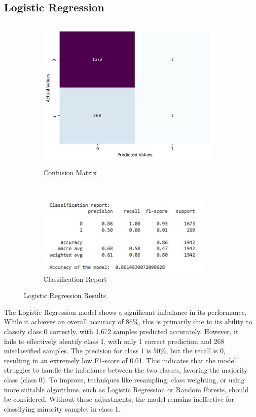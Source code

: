 \documentclass[12pt]{report}
\begin{document}
    \subsection{Logistic Regression}

    \begin{figure}[h!]
        \centering
        \begin{subfigure}[b]{0.5\textwidth}
            \centering
            \includegraphics[height=3in]{resources/pic/CM Logistic Regression.png}
            \caption{Confusion Matrix}
            \label{fig:Logistic Regression Confusion Matrix}
        \end{subfigure}%
        \\
        \begin{subfigure}[b]{0.4\textwidth}
            \centering
            \includegraphics[height=1.5in]{resources/pic/Report Logistic Regression.png}
            \caption{Classification Report}
            \label{fig:Logistic Regression Classification Report}
        \end{subfigure}
        \caption{Logistic Regression Results}
    \end{figure}

    The Logistic Regression model shows a significant imbalance in its performance. While it achieves an overall accuracy of 86\%, this is primarily due to its ability to classify class 0 correctly, with 1,672 samples predicted accurately. However, it fails to effectively identify class 1, with only 1 correct prediction and 268 misclassified samples. The precision for class 1 is 50\%, but the recall is 0, resulting in an extremely low F1-score of 0.01. This indicates that the model struggles to handle the imbalance between the two classes, favoring the majority class (class 0). To improve, techniques like resampling, class weighting, or using more suitable algorithms, such as Logistic Regression or Random Forests, should be considered. Without these adjustments, the model remains ineffective for classifying minority samples in class 1.
\end{document}
